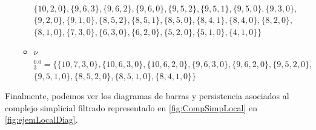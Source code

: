 \documentclass[12pt, a4paper, twoside]{book}
\numberwithin{equation}{section}
\theoremstyle{definition}
\newenvironment{ejem}
  {\pushQED{\qed}\renewcommand{\qedsymbol}{$\blacktriangleleft$}\ejemplo}
  {\popQED\endejemplo}
\theoremstyle{remark}
\theoremstyle{plain}
\begin{document}
\begin{ejem}
\begin{itemize}
\begin{itemize}
						\\$\{10, 2, 0\},\{9, 6, 3\},\{9, 6, 2\},\{9, 6, 0\},\{9, 5, 2\},\{9, 5, 1\},\{9, 5, 0\},\{9, 3, 0\},$
					\\$\{9, 2, 0\},\{9, 1, 0\},\{8, 5, 2\},\{8, 5, 1\},\{8, 5, 0\},\{8, 4, 1\},\{8, 4, 0\},\{8, 2, 0\},$
				\\$\{8, 1, 0\},\{7, 3, 0\},\{6, 3, 0\},\{6, 2, 0\},\{5, 2, 0\},\{5, 1, 0\},\{4, 1, 0\}\}$
					\item {\Large $\nu$}$^{0.0}_{3}=\{\{10, 7, 3, 0\},\{10, 6, 3, 0\},\{10, 6, 2, 0\},\{9, 6, 3, 0\},\{9, 6, 2, 0\},\{9, 5, 2, 0\},$
						\\$\{9, 5, 1, 0\},\{8, 5, 2, 0\},\{8, 5, 1, 0\},\{8, 4, 1, 0\}\}$
				\end{itemize}
		\end{itemize}

	Finalmente, podemos ver los diagramas de barras y persistencia 
	asociados al complejo simplicial filtrado representado en 
	\autoref{fig:CompSimpLocal} en \autoref{fig:ejemLocalDiag}.
	

\end{ejem}
\end{document}
